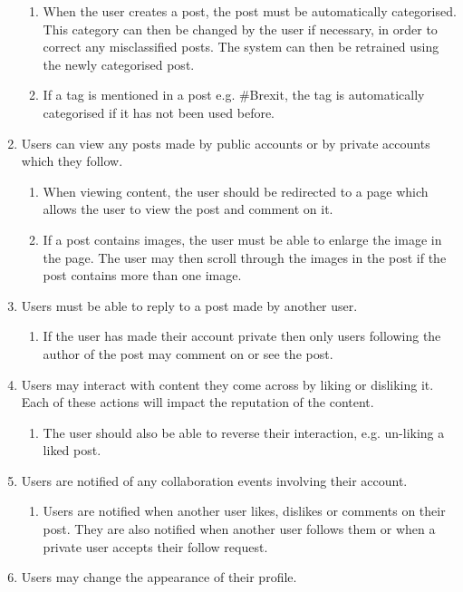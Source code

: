 \begin{enumerate}[label=\textbf{F\arabic*}]
\begin{enumerate}
			\item When the user creates a post, the post must be automatically categorised. This category can then be changed by the user if necessary, in order to correct any misclassified posts. The system can then be retrained using the newly categorised post.
			\item If a tag is mentioned in a post e.g. \#Brexit, the tag is automatically categorised if it has not been used before.
		\end{enumerate}
	\item Users can view any posts made by public accounts or by private accounts which they follow.
		\begin{enumerate}
			\item When viewing content, the user should be redirected to a page which allows the user to view the post and comment on it.
			\item If a post contains images, the user must be able to enlarge the image in the page. The user may then scroll through the images in the post if the post contains more than one image.
		\end{enumerate}
	\item Users must be able to reply to a post made by another user.
		\begin{enumerate}
			\item If the user has made their account private then only users following the author of the post may comment on or see the post.
		\end{enumerate}
	\item Users may interact with content they come across by liking or disliking it. Each of these actions will impact the reputation of the content.
		\begin{enumerate}
			\item The user should also be able to reverse their interaction, e.g. un-liking a liked post.
		\end{enumerate}
	\item Users are notified of any collaboration events involving their account.
		\begin{enumerate}
			\item Users are notified when another user likes, dislikes or comments on their post. They are also notified when another user follows them or when a private user accepts their follow request.
		\end{enumerate}
	\item Users may change the appearance of their profile.
		\begin{enumerate}

\end{enumerate}
\end{enumerate}
